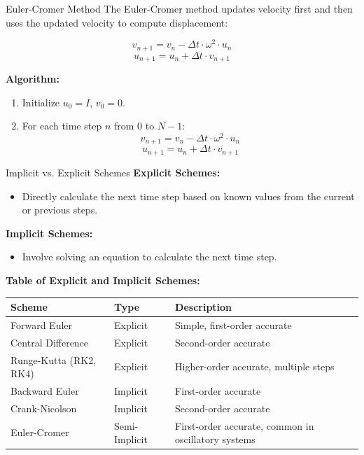 \documentclass[10pt, aspectratio=54]{beamer}
\begin{document}
\begin{frame}{Euler-Cromer Method}
	\justifying
	The Euler-Cromer method updates velocity first and then uses the updated velocity to compute displacement:
	
	\[
	v_{n+1} = v_n - \Delta t \cdot \omega^2 \cdot u_n
	\]
	\[
	u_{n+1} = u_n + \Delta t \cdot v_{n+1}
	\]
	
	\textbf{Algorithm:}
	\begin{enumerate}
		\item Initialize \( u_0 = I \), \( v_0 = 0 \).
		\item For each time step \( n \) from 0 to \( N-1 \):
		\[
		v_{n+1} = v_n - \Delta t \cdot \omega^2 \cdot u_n
		\]
		\[
		u_{n+1} = u_n + \Delta t \cdot v_{n+1}
		\]
	\end{enumerate}
\end{frame}

\begin{frame}{Implicit vs. Explicit Schemes}
	\justifying
	\textbf{Explicit Schemes:}
	\begin{itemize}
		\item Directly calculate the next time step based on known values from the current or previous steps.
	\end{itemize}
	
	\textbf{Implicit Schemes:}
	\begin{itemize}
		\item Involve solving an equation to calculate the next time step.
	\end{itemize}
	
	\vspace{0.3cm}
	\textbf{Table of Explicit and Implicit Schemes:}
	

		\centering
		\begin{tabular}{|p{3.5cm}|p{2cm}|p{5cm}|}
			\hline
			\textbf{Scheme}         & \textbf{Type}    & \textbf{Description}                \\ \hline
			Forward Euler           & Explicit         & Simple, first-order accurate        \\ \hline
			Central Difference      & Explicit         & Second-order accurate               \\ \hline
			Runge-Kutta (RK2, RK4)  & Explicit         & Higher-order accurate, multiple steps \\ \hline
			Backward Euler          & Implicit         & First-order accurate    \\ \hline
			Crank-Nicolson          & Implicit         & Second-order accurate\\ \hline
			Euler-Cromer            & Semi-Implicit    & First-order accurate, common in oscillatory systems       \\ \hline
		\end{tabular}

	
\end{frame}
\end{document}

